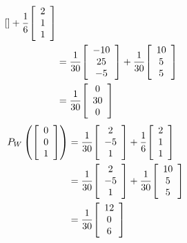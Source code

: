 \documentclass[11pt, a4paper, norsk]{NTNUoving}
\newenvironment{pkt}{\begin{punkt}}{\end{punkt}}
\newenvironment{matrise}[1][c]{
        \left[
            \begin{array}{#1}
    }
    {    
    \end{array}
    \right]           
}
\begin{document}
\begin{oppgave}
\begin{pkt}
\begin{align*}
\begin{matrise}
            \end{matrise} + \frac{1}{6}\begin{matrise}
            2\\1\\1
            \end{matrise}
            \\&=\frac{1}{30}\begin{matrise}
            -10\\25\\-5
            \end{matrise} + \frac{1}{30}\begin{matrise}
            10\\5\\5
            \end{matrise}
            \\&=\frac{1}{30}\begin{matrise}
            0\\30\\0
            \end{matrise}
        \end{align*}
        \begin{align*}
            P_W\left( \begin{matrise}
            0\\0\\1
            \end{matrise}\right) &= \frac{1}{30}\begin{matrise}
            2\\-5\\1
            \end{matrise} + \frac{1}{6}\begin{matrise}
            2\\1\\1
            \end{matrise}
            \\&= \frac{1}{30}\begin{matrise}
            2\\-5\\1
            \end{matrise} + \frac{1}{30}\begin{matrise}
            10\\5\\5
            \end{matrise}
            \\&=\frac{1}{30}\begin{matrise}
            12\\0\\6
            \end{matrise}
        \end{align*}
        

\end{pkt}
\end{oppgave}
\end{document}
